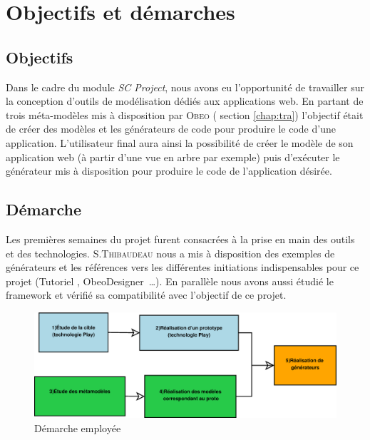 \chapter{Objectifs et démarches}\label{chap:mod}


\section{Objectifs}
Dans le cadre du module \emph{SC Project}, nous avons eu l'opportunité de travailler sur la conception d'outils de modélisation dédiés aux applications web. En partant de trois méta-modèles mis à disposition par \textsc{Obeo}
(\cf{} section \ref{chap:tra}) l'objectif était de créer des modèles et les générateurs de code pour produire le code d'une application. L'utilisateur final aura ainsi la possibilité de créer le modèle de son application web (à partir d'une vue en arbre par exemple) puis d'exécuter le générateur mis à disposition pour produire le code de l'application désirée.


\section{Démarche} 
Les premières semaines du projet furent consacrées à la prise en main des outils et des technologies. S.\textsc{Thibaudeau} nous a mis à disposition des exemples de générateurs et les références vers les différentes initiations indispensables pour ce projet (Tutoriel \kwacceleo{}, ObeoDesigner~\dots). En parallèle nous avons aussi étudié le framework \kwplay{} et vérifié sa compatibilité avec l'objectif de ce projet.

\begin{figure}[htb]
  \includegraphics[scale=.35]{img/demarche.eps}
  \caption{Démarche employée}
  \label{fig:dem}
\end{figure}

